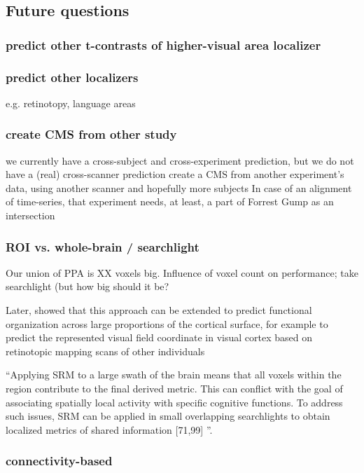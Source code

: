 \subsection{Future questions}

\subsubsection{predict other t-contrasts of higher-visual area localizer}

\subsubsection{predict other localizers}
%
e.g. retinotopy, language areas


\subsubsection{create CMS from other study}
%
we currently have a cross-subject and cross-experiment prediction,
but we do not have a (real) cross-scanner prediction
%
create a CMS from another experiment’s data,
using another scanner and hopefully more subjects
%
In case of an alignment of time-series,
that experiment needs, at least, a part of Forrest Gump as an intersection


\subsubsection{ROI vs. whole-brain / searchlight}
%
Our union of PPA is XX voxels big.
%
Influence of voxel count on performance; take searchlight (but how big should it
be?

Later, \citet{guntupalli2016model} showed that this approach can be extended to
predict functional organization across large proportions of the cortical
surface, for example to predict the represented visual field coordinate in
visual cortex based on retinotopic mapping scans of other individuals

``Applying SRM to a large swath of the brain means that all voxels within the
region contribute to the final derived metric. This can conflict with the goal
of associating spatially local activity with specific cognitive functions. To
address such issues, SRM can be applied in small overlapping searchlights to
obtain localized metrics of shared information [71,99]
\citep{cohen2017computational}''.


\subsubsection{connectivity-based}

